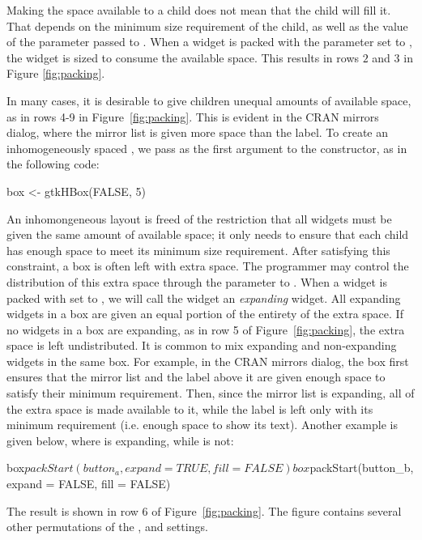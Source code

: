 \documentclass[article,shortnames]{jss}
\begin{document}
Making the space available to a child does not mean that the
child will fill it. That depends on the minimum size requirement of
the child, as well as the value of the  parameter passed to
. When a widget is packed with the 
parameter set to , the widget is sized to consume the
available space. This results in rows $2$ and $3$ in Figure
\ref{fig:packing}.


In many cases, it is desirable to give children unequal amounts of
available space, as in rows 4-9 in Figure~\ref{fig:packing}. This is
evident in the CRAN mirrors dialog, where the mirror list is given
more space than the  label. To create an
inhomogeneously spaced , we pass
 as the first argument to the constructor, as in the
following code:
\begin{Code}
box <- gtkHBox(FALSE, 5)
\end{Code}

An inhomongeneous layout is freed of the restriction that all widgets
must be given the same amount of available space; it only needs to
ensure that each child has enough space to meet its minimum size
requirement. After satisfying this constraint, a box is often left
with extra space. The programmer may control the distribution of this
extra space through the  parameter to
.  When a widget is packed with 
set to , we will call the widget an \emph{expanding}
widget. All expanding widgets in a box are given an equal portion of
the entirety of the extra space. If no widgets in a box are expanding,
as in row 5 of Figure~\ref{fig:packing}, the extra space is left
undistributed. It is common to mix expanding and non-expanding widgets
in the same box. For example, in the CRAN mirrors dialog, the box
first ensures that the mirror list and the label above it are given
enough space to satisfy their minimum requirement. Then, since the
mirror list is expanding, all of the extra space is made available to
it, while the label is left only with its minimum requirement (i.e.
enough space to show its text).
Another example is given below, where  is expanding,
while  is not:
\begin{Code}
box$packStart(button_a, expand = TRUE, fill = FALSE)
box$packStart(button_b, expand = FALSE, fill = FALSE)
\end{Code}
The result is shown in row 6 of Figure~\ref{fig:packing}. 
The figure contains several other permutations of the
,  and  settings.
\end{document}
